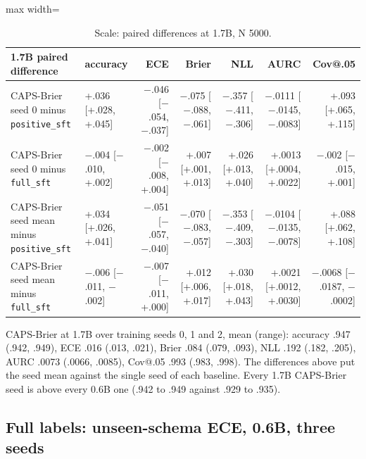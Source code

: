 \documentclass[10pt,letterpaper]{article}
\theoremstyle{plain}
\begin{document}
\begin{table}[H]
\centering
\footnotesize
\setlength{\tabcolsep}{3pt}
\caption{Scale: paired differences at 1.7B, N 5000.}
\label{tab:A5b}
\begin{adjustbox}{max width=\textwidth}
\begin{tabular}{llrrrrr}
\toprule
1.7B paired difference & accuracy & ECE & Brier & NLL & AURC & Cov@.05 \\
\midrule
CAPS-Brier seed 0 minus \texttt{positive\_sft} & +.036 [+.028, +.045] & $-$.046 [$-$.054, $-$.037] & $-$.075 [$-$.088, $-$.061] & $-$.357 [$-$.411, $-$.306] & $-$.0111 [$-$.0145, $-$.0083] & +.093 [+.065, +.115] \\
CAPS-Brier seed 0 minus \texttt{full\_sft} & $-$.004 [$-$.010, +.002] & $-$.002 [$-$.008, +.004] & +.007 [+.001, +.013] & +.026 [+.013, +.040] & +.0013 [+.0004, +.0022] & $-$.002 [$-$.015, +.001] \\
CAPS-Brier seed mean minus \texttt{positive\_sft} & +.034 [+.026, +.041] & $-$.051 [$-$.057, $-$.040] & $-$.070 [$-$.083, $-$.057] & $-$.353 [$-$.409, $-$.303] & $-$.0104 [$-$.0135, $-$.0078] & +.088 [+.062, +.108] \\
CAPS-Brier seed mean minus \texttt{full\_sft} & $-$.006 [$-$.011, $-$.002] & $-$.007 [$-$.011, +.000] & +.012 [+.006, +.017] & +.030 [+.018, +.043] & +.0021 [+.0012, +.0030] & $-$.0068 [$-$.0187, $-$.0002] \\
\bottomrule
\end{tabular}
\end{adjustbox}
\end{table}

CAPS-Brier at 1.7B over training seeds 0, 1 and 2, mean (range): accuracy .947 (.942, .949), ECE .016 (.013, .021), Brier .084 (.079, .093), NLL .192 (.182, .205), AURC .0073 (.0066, .0085), Cov@.05 .993 (.983, .998). The differences above put the seed mean against the single seed of each baseline. Every 1.7B CAPS-Brier seed is above every 0.6B one (.942 to .949 against .929 to .935).

\subsection{Full labels: unseen-schema ECE, 0.6B, three seeds}\label{sec:A6}
\end{document}
